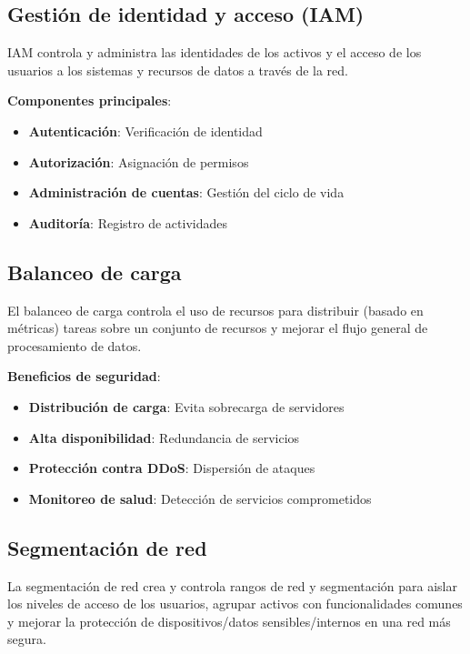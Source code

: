 \subsection{Gestión de identidad y acceso (IAM)}

IAM controla y administra las identidades de los activos y el acceso de los usuarios a los sistemas y recursos de datos a través de la red.

\textbf{Componentes principales}:
\begin{itemize}
    \item \textbf{Autenticación}: Verificación de identidad
    \item \textbf{Autorización}: Asignación de permisos
    \item \textbf{Administración de cuentas}: Gestión del ciclo de vida
    \item \textbf{Auditoría}: Registro de actividades
\end{itemize}

\subsection{Balanceo de carga}

El balanceo de carga controla el uso de recursos para distribuir (basado en métricas) tareas sobre un conjunto de recursos y mejorar el flujo general de procesamiento de datos.

\textbf{Beneficios de seguridad}:
\begin{itemize}
    \item \textbf{Distribución de carga}: Evita sobrecarga de servidores
    \item \textbf{Alta disponibilidad}: Redundancia de servicios
    \item \textbf{Protección contra DDoS}: Dispersión de ataques
    \item \textbf{Monitoreo de salud}: Detección de servicios comprometidos
\end{itemize}

\subsection{Segmentación de red}

La segmentación de red crea y controla rangos de red y segmentación para aislar los niveles de acceso de los usuarios, agrupar activos con funcionalidades comunes y mejorar la protección de dispositivos/datos sensibles/internos en una red más segura.

